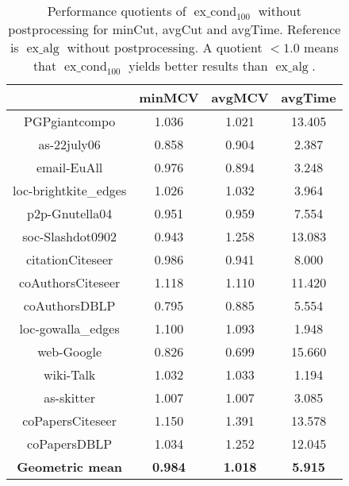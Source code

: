 \documentclass[pdftex]{llncs}
\newcommand{\excond}{\operatorname{ex\_cond}}
\newcommand{\exalg}{\operatorname{ex\_alg}}
\numberwithin{equation}{section}
\numberwithin{example}{section}
\numberwithin{table}{section}
\begin{document}
\begin{table}[tb]
  \caption{Performance quotients of $\excond_{100}$ without postprocessing for minCut, avgCut
    and avgTime. Reference is $\exalg$ without postprocessing. A quotient $< 1.0$ means that
    $\excond_{100}$ yields better results than $\exalg$.}
\begin{center}
\begin{tabular}{ c | c  c | c }
& minMCV  & avgMCV & avgTime\\
                        \hline \hline
PGPgiantcompo           &  1.036              &  1.021               &  13.405               \\ \hline
as-22july06             &  0.858              &  0.904               &   2.387               \\ \hline
email-EuAll             &  0.976              &  0.894               &   3.248               \\ \hline
loc-brightkite\_edges   &  1.026              &  1.032               &   3.964               \\ \hline
p2p-Gnutella04          &  0.951              &  0.959               &   7.554               \\ \hline
soc-Slashdot0902        &  0.943              &  1.258               &  13.083               \\ \hline
citationCiteseer        &  0.986              &  0.941               &   8.000               \\ \hline
coAuthorsCiteseer       &  1.118              &  1.110               &  11.420               \\ \hline 
coAuthorsDBLP           &  0.795              &  0.885               &   5.554               \\ \hline
loc-gowalla\_edges      &  1.100              &  1.093               &   1.948               \\ \hline
web-Google              &  0.826              &  0.699               &  15.660               \\ \hline
wiki-Talk               &  1.032              &  1.033               &   1.194               \\ \hline
as-skitter              &  1.007              &  1.007               &   3.085               \\ \hline
coPapersCiteseer        &  1.150              &  1.391               &  13.578               \\ \hline
coPapersDBLP            &  1.034              &  1.252               &  12.045               \\ \hline  \hline
\textbf{Geometric mean} &  \textbf{0.984}     &  \textbf{1.018}      &\textbf{5.915}         \\ \hline
\end{tabular}
\end{center}
\label{tab:cut_100}
\end{table}
\end{document}
